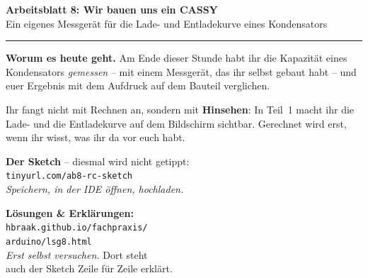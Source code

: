 \documentclass[a4paper,12pt]{scrartcl}
\begin{document}
\begin{center}
{\Large\textbf{Arbeitsblatt 8: Wir bauen uns ein CASSY}}\\[4pt]
\normalsize Ein eigenes Messgerät für die Lade- und Entladekurve eines Kondensators
\end{center}

\vspace{2pt}
\hrule
\vspace{7pt}

\begin{auftrag}
\textbf{Worum es heute geht.} Am Ende dieser Stunde habt ihr die Kapazität eines Kondensators
\emph{gemessen} -- mit einem Messgerät, das ihr selbst gebaut habt -- und euer Ergebnis mit dem
Aufdruck auf dem Bauteil verglichen.

\smallskip
\noindent Ihr fangt nicht mit Rechnen an, sondern mit \textbf{Hinsehen}: In Teil~1 macht ihr
die Lade- und die Entladekurve auf dem Bildschirm sichtbar. Gerechnet wird erst, wenn ihr wisst,
was ihr da vor euch habt.
\end{auftrag}

\vspace{7pt}

\begin{center}
\noindent
\begin{minipage}[c]{2.0cm}
\end{minipage}%
\hspace{5pt}%
\begin{minipage}[c]{5.9cm}
\raggedright\small\textbf{Der Sketch} -- diesmal wird nicht getippt:\\
\texttt{tinyurl.com/ab8-rc-sketch}\\[2pt]
\emph{Speichern, in der IDE öffnen, hochladen.}
\end{minipage}%
\hspace{12pt}%
\begin{minipage}[c]{2.0cm}
\end{minipage}%
\hspace{5pt}%
\begin{minipage}[c]{5.9cm}
\raggedright\small\textbf{Lösungen \& Erklärungen:}\\
\texttt{hbraak.github.io/fachpraxis/}\\
\texttt{arduino/lsg8.html}\\[2pt]
\emph{Erst selbst versuchen.} Dort steht\\
auch der Sketch Zeile für Zeile erklärt.
\end{minipage}
\end{center}
\end{document}

